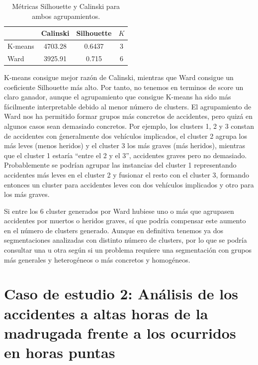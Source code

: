 \documentclass[oneside]{book}
\begin{document}
\begin{table}[H]
  \centering
  \begin{tabular}{|l|ccc|} \hline & Calinski & Silhouette & $K$ \\
    \hline K-means & 4703.28 & 0.6437 & 3 \\ \hline Ward & 3925.91 &
    0.715 & 6 \\ \hline
  \end{tabular}
  \caption{Métricas Silhouette y Calinski para ambos agrupamientos.}
  \label{tab:comp-scores1}
\end{table}

K-means consigue mejor razón de Calinski, mientras que Ward consigue
un coeficiente Silhouette más alto. Por tanto, no tenemos en terminos
de score un claro ganador, aunque el agrupamiento que consigue K-means
ha sido más fácilmente interpretable debido al menor número de
clusters. El agrupamiento de Ward nos ha permitido formar grupos más
concretos de accidentes, pero quizá en algunos casos sean demasiado
concretos. Por ejemplo, los clusters 1, 2 y 3 constan de accidentes
con ǵeneralmente dos vehículos implicados, el cluster 2 agrupa los más
leves (menos heridos) y el cluster 3 los más graves (más heridos),
mientras que el cluster 1 estaría ``entre el 2 y el 3'', accidentes
graves pero no demasiado. Probablemente se podrían agrupar las
instancias del cluster 1 representando accidentes más leves en el
cluster 2 y fusionar el resto con el cluster 3, formando entonces un
cluster para accidentes leves con dos vehículos implicados y otro para
los más graves.

Si entre los 6 cluster generados por Ward hubiese uno o más que
agrupasen accidentes por muertos o heridos graves, sí que podría
compensar este aumento en el número de clusters generado. Aunque en
definitiva tenemos ya dos segmentaciones analizadas con distinto
número de clusters, por lo que se podría consultar una u otra según si
un problema requiere una segmentación con grupos más generales y
heterogéneos o más concretos y homogéneos.

\section{Caso de estudio 2: Análisis de los accidentes a altas horas
  de la madrugada frente a los ocurridos en horas puntas}
\end{document}
